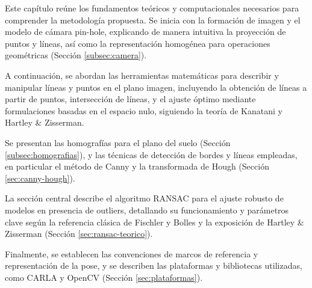 Este capítulo reúne los fundamentos teóricos y computacionales necesarios para comprender la metodología propuesta. Se inicia con la formación de imagen y el modelo de cámara pin-hole, explicando de manera intuitiva la proyección de puntos y líneas, así como la representación homogénea para operaciones geométricas (Sección \ref{subsec:camera}).

A continuación, se abordan las herramientas matemáticas para describir y manipular líneas y puntos en el plano imagen, incluyendo la obtención de líneas a partir de puntos, intersección de líneas, y el ajuste óptimo mediante formulaciones basadas en el espacio nulo, siguiendo la teoría de Kanatani y Hartley \& Zisserman.

Se presentan las homografías para el plano del suelo (Sección \ref{subsec:homografias}), y las técnicas de detección de bordes y líneas empleadas, en particular el método de Canny y la transformada de Hough (Sección \ref{sec:canny-hough}).

La sección central describe el algoritmo RANSAC para el ajuste robusto de modelos en presencia de outliers, detallando su funcionamiento y parámetros clave según la referencia clásica de Fischler y Bolles y la exposición de Hartley \& Zisserman (Sección \ref{sec:ransac-teorico}).

Finalmente, se establecen las convenciones de marcos de referencia y representación de la pose, y se describen las plataformas y bibliotecas utilizadas, como CARLA y OpenCV (Sección \ref{sec:plataformas}).
